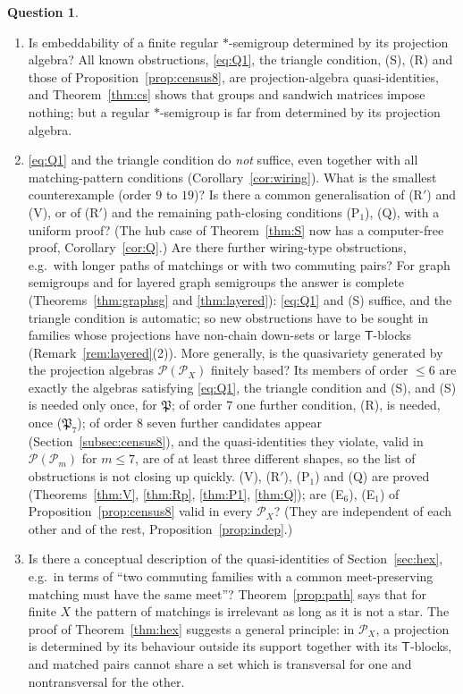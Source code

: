 \documentclass[11pt]{amsart}
\theoremstyle{definition}
\newtheorem{question}[theorem]{Question}
\renewcommand{\P}{\mathcal{P}}
\newcommand{\T}{\mathsf{T}}
\begin{document}
\begin{question}
\begin{enumerate}[label=\textup{(\arabic*)}]
\item Is embeddability of a finite regular $*$-semigroup determined by its projection algebra? All known obstructions, \eqref{eq:Q1}, the triangle condition, (S), (R) and those of Proposition~\ref{prop:census8}, are projection-algebra quasi-identities, and Theorem~\ref{thm:cs} shows that groups and sandwich matrices impose nothing; but a regular $*$-semigroup is far from determined by its projection algebra.
\item \eqref{eq:Q1} and the triangle condition do \emph{not} suffice, even together with all matching-pattern conditions (Corollary~\ref{cor:wiring}). What is the smallest counterexample (order $9$ to $19$)? Is there a common generalisation of (R$'$) and (V), or of (R$'$) and the remaining path-closing conditions (P$_1$), (Q), with a uniform proof? (The hub case of Theorem~\ref{thm:S} now has a computer-free proof, Corollary~\ref{cor:Q}.) Are there further wiring-type obstructions, e.g.\ with longer paths of matchings or with two commuting pairs? For graph semigroups and for layered graph semigroups the answer is complete (Theorems~\ref{thm:graphsg} and \ref{thm:layered}): \eqref{eq:Q1} and (S) suffice, and the triangle condition is automatic; so new obstructions have to be sought in families whose projections have non-chain down-sets or large $\T$-blocks (Remark~\ref{rem:layered}(2)). More generally, is the quasivariety generated by the projection algebras $\P(\P_X)$ finitely based? Its members of order $\le6$ are exactly the algebras satisfying \eqref{eq:Q1}, the triangle condition and (S), and (S) is needed only once, for $\mathfrak P$; of order $7$ one further condition, (R), is needed, once ($\mathfrak P_7$); of order $8$ seven further candidates appear (Section~\ref{subsec:census8}), and the quasi-identities they violate, valid in $\P(\P_m)$ for $m\le7$, are of at least three different shapes, so the list of obstructions is not closing up quickly. (V), (R$'$), (P$_1$) and (Q) are proved (Theorems~\ref{thm:V}, \ref{thm:Rp}, \ref{thm:P1}, \ref{thm:Q}); are (E$_6$), (E$_1$) of Proposition~\ref{prop:census8} valid in every $\P_X$? (They are independent of each other and of the rest, Proposition~\ref{prop:indep}.)
\item Is there a conceptual description of the quasi-identities of Section~\ref{sec:hex}, e.g.\ in terms of ``two commuting families with a common meet-preserving matching must have the same meet''? Theorem~\ref{prop:path} says that for finite $X$ the pattern of matchings is irrelevant as long as it is not a star. The proof of Theorem~\ref{thm:hex} suggests a general principle: in $\P_X$, a projection is determined by its behaviour outside its support together with its $\T$-blocks, and matched pairs cannot share a set which is transversal for one and nontransversal for the other.

\end{enumerate}
\end{question}
\end{document}
